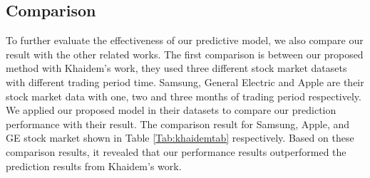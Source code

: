 \documentclass[12pt]{article}
\begin{document}
\subsection{Comparison}
  
To further evaluate the effectiveness of our predictive model, we also compare our result with the other related works. The first comparison is between our proposed method with Khaidem's work\cite{khaidem2016predicting}, they used three different stock market datasets with different trading period time. Samsung, General Electric and Apple are their stock market data with one, two and three months of trading period respectively. We applied our proposed model in their datasets to compare our prediction performance with their result. The comparison result for Samsung, Apple, and GE stock market shown in Table \ref{Tab:khaidemtab} respectively. Based on these comparison results, it revealed that our performance results outperformed the prediction results from Khaidem's work\cite{khaidem2016predicting}.
\end{document}

